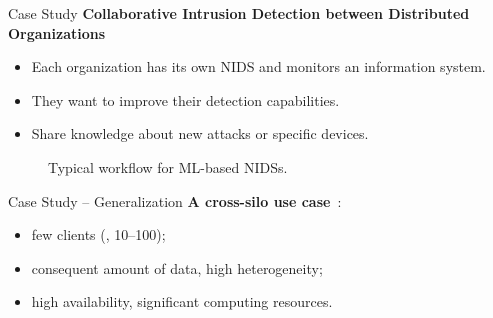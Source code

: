 \begin{frame}{Case Study}
  \textbf{Collaborative Intrusion Detection between Distributed Organizations}
  \begin{itemize}
    \item Each organization has its own NIDS and monitors an information system.
    \item They want to improve their detection capabilities.
    \item Share knowledge about new attacks or specific devices.
  \end{itemize}

  \pause
  \begin{figure}
    \centering
    \caption{Typical workflow for ML-based NIDSs.}
  \end{figure}
\end{frame}

\begin{frame}{Case Study -- Generalization}
  \textbf{A cross-silo use case}~\cite{kairouz_AdvancesOpenProblems_2021}:
  \begin{itemize}
    \item few clients (\ie, 10--100);
    \item consequent amount of data, high heterogeneity;
    \item high availability, significant computing resources.
  \end{itemize}
\end{frame}

